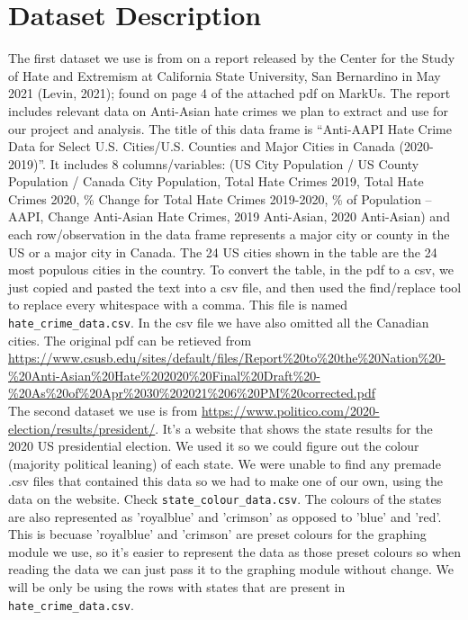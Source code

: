 \documentclass[fontsize=11pt]{article}
\begin{document}
\section*{Dataset Description}

\quad The first dataset we use is from on a report released by the Center for the Study of Hate and Extremism at California State University, San Bernardino in May 2021 (Levin, 2021); found on page 4 of the attached pdf on MarkUs. The report includes relevant data on Anti-Asian hate crimes we plan to extract and use for our project and analysis. The title of this data frame is “Anti-AAPI Hate Crime Data for Select U.S. Cities/U.S. Counties and Major Cities in Canada (2020-2019)”. It includes 8 columns/variables: (US City Population / US County Population / Canada City Population, Total Hate Crimes 2019, Total Hate Crimes 2020, \% Change for Total Hate Crimes 2019-2020, \% of Population – AAPI, Change Anti-Asian Hate Crimes, 2019 Anti-Asian, 2020 Anti-Asian) and each row/observation in the data frame represents a major city or county in the US or a major city in Canada. The 24 US cities shown in the table are the 24 most populous cities in the country. To convert the table, in the pdf to a csv, we just copied and pasted the text into a csv file, and then used the find/replace tool to replace every whitespace with a comma. This file is named \texttt{hate\_crime\_data.csv}. In the csv file we have also omitted all the Canadian cities. The original pdf can be retieved from \url{https://www.csusb.edu/sites/default/files/Report%20to%20the%20Nation%20-%20Anti-Asian%20Hate%202020%20Final%20Draft%20-%20As%20of%20Apr%2030%202021%206%20PM%20corrected.pdf}
\\

The second dataset we use is from \url{https://www.politico.com/2020-election/results/president/}. It's a website that shows the state results for the 2020 US presidential election. We used it so we could figure out the colour (majority political leaning) of each state. We were unable to find any premade .csv files that contained this data so we had to make one of our own, using the data on the website. Check \texttt{state\_colour\_data.csv}. The colours of the states are also represented as 'royalblue' and 'crimson' as opposed to 'blue' and 'red'. This is becuase 'royalblue' and 'crimson' are preset colours for the graphing module we use, so it's easier to represent the data as those preset colours so when reading the data we can just pass it to the graphing module without change. We will be only be using the rows with states that are present in \texttt{hate\_crime\_data.csv}. \\
\end{document}
